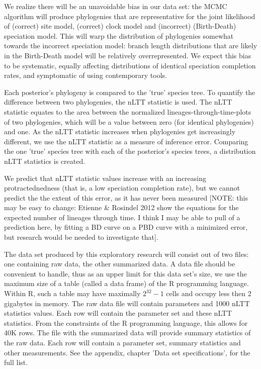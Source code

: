 \documentclass{article}
\begin{document}
We realize there will be an unavoidable bias in our data set: the MCMC
algorithm will produce phylogenies that are representative for the joint
likelihood of (correct) site model, (correct) clock model and 
(incorrect) (Birth-Death) speciation model. This will
warp the distribution of phylogenies somewhat towards the incorrect
speciation model: branch length distributions that are likely in the
Birth-Death model will be relatively overrepresented. We expect
this bias to be systematic, equally affecting distributions
of identical speciation completion rates, and symptomatic
of using contemporary tools.

Each posterior's phylogeny is compared to the 'true' species tree.
To quantify the difference between two phylogenies, the nLTT statistic
is used. The nLTT statistic equates to the area between the normalized
lineages-through-time-plots of two phylogenies, which will be a value between 
zero (for identical phylogenies) and one. As the nLTT statistic increases
when phylogenies get increasingly different, we use the nLTT statistic
as a measure of inference error. Comparing the one 'true' species tree
with each of the posterior's species trees, a distribution nLTT statistics
is created. 

We predict that nLTT statistic values increase 
with an increasing protractednedness (that is, a low speciation completion rate),
but we cannot predict the the extent of this error, as it has never been 
measured [NOTE: this may be easy to change: Etienne & Rosindel 2012 show the equations
for the expected number of lineages through time. I think I may be able to pull
of a prediction here, by fitting a BD curve on a PBD curve with a minimized error,
but research would be needed to investigate that].

The data set produced by this exploratory research will consist out of two files:
one containing raw data, the other summarized data. 
A data file should be convenient to handle, thus as an upper limit for this data set's size, 
we use the maximum size of a table (called a data frame) of the R programming 
language. Within R, such a table may have maximally $2^{32}-1$ cells and occupy
less then 2 gigabytes in memory. 
The raw data file will contain parameters and 1000 nLTT statistics values.
Each row will contain the parameter set and these nLTT statistics.
From the constraints of the R programming language, this allows for 40K rows. 
The file with the summarized data will provide summary statistics of the raw
data. Each row will contain a parameter set, summary statistics and other
measurements. See the appendix, chapter 'Data set specifications', for the full list.
\end{document}
